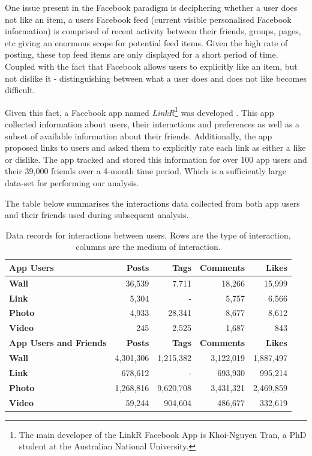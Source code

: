 One issue present in the Facebook paradigm is deciphering whether a user does not like an item, a users Facebook feed (current visible 
personalised Facebook information) is comprised of recent
activity  between their friends, groups, pages, etc giving an enormous scope for potential feed items.
Given the high rate of posting, these top feed items are only displayed for a short period of time. Coupled 
with the fact that Facebook allows users to explicitly like an item, but not dislike it - distinguishing between what 
a user does and does not like becomes difficult.


Given this fact, a Facebook app named \emph{LinkR}\footnote{The main developer of the LinkR Facebook App is Khoi-Nguyen Tran, a PhD student at the Australian National University.} was developed \cite{www}.
This app collected information about users, their interactions and preferences as well as a subset of available information about 
their friends. Additionally, the app proposed links to users and asked them to explicitly rate each link as either a like or dislike. 
The app tracked and stored this information for over 100 app users and their 39,000 friends over a 4-month time period. Which is a sufficiently large data-set for 
performing our analysis.

The table below summarises the interactions data collected from both app users and their friends used during subsequent analysis.

\begin{table}[h!]
\centering
	\begin{tabular}{|l|r|r|r|r|} %
		\hline
		\textbf{App Users} & \textbf{Posts} & \textbf{Tags} & \textbf{Comments} & \textbf{Likes}  \\ \hline
		\textbf{Wall} & 36,539 & 7,711 & 18,266 & 15,999 \\ \hline
		\textbf{Link} & 5,304 & - & 5,757 & 6,566 \\ \hline
		\textbf{Photo} & 4,933 & 28,341 & 8,677 & 8,612 \\ \hline
		\textbf{Video} & 245 & 2,525 & 1,687 & 843 \\ \hline
		 \hline
		\textbf{App Users and Friends} & \textbf{Posts} & \textbf{Tags} & \textbf{Comments} & \textbf{Likes}  \\ \hline
		\textbf{Wall} & 4,301,306 & 1,215,382 & 3,122,019 & 1,887,497 \\ \hline
		\textbf{Link} & 678,612 & - & 693,930 & 995,214 \\ \hline
		\textbf{Photo} & 1,268,816 & 9,620,708 & 3,431,321 & 2,469,859 \\ \hline
		\textbf{Video} & 59,244 & 904,604 & 486,677 & 332,619 \\ \hline
	\end{tabular}
	\caption{Data records for interactions between users. Rows are the type of interaction, columns are the medium of interaction.}
	\label{tab:revpol}
\end{table}

